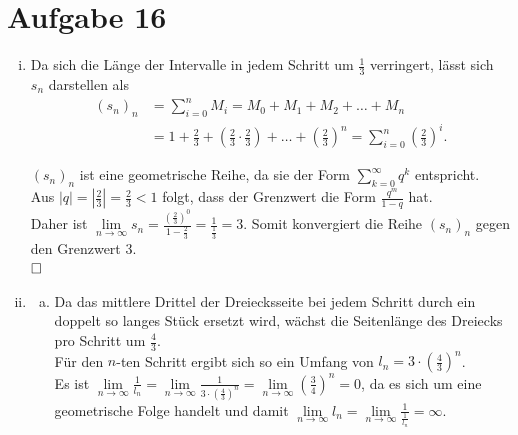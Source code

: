 \documentclass[12pt,a4paper]{article}
\newcommand{\qed}{\null\nobreak\hfill\square}
\begin{document}
\section*{Aufgabe 16}

\begin{enumerate}[(i)]
    \item Da sich die Länge der Intervalle in jedem Schritt um $\frac{1}{3}$ verringert, lässt sich $s_n$ darstellen als
    \begin{align*}
    (s_n)_n &= \sum\limits_{i=0}^n M_i = M_0 + M_1 + M_2 + \dots + M_n\\
    &= 1 + \frac{2}{3} + \left(\frac{2}{3} \cdot \frac{2}{3}\right) + \dots + \left(\frac{2}{3}\right)^n = \sum\limits_{i=0}^n \left(\frac{2}{3}\right)^i.
    \end{align*}

    $(s_n)_n$ ist eine geometrische Reihe, da sie der Form $\sum\limits_{k=0}^\infty q^k$ entspricht.\\
    Aus $|q| = \left|\frac{2}{3}\right| = \frac{2}{3} < 1$ folgt, dass der Grenzwert die Form $\frac{q^m}{1-q}$ hat.\\
    Daher ist $\lim\limits_{n \to \infty} s_n = \frac{\left(\frac{2}{3}\right)^0}{1 - \frac{2}{3}} = \frac{1}{\frac{1}{3}} = 3$.
    Somit konvergiert die Reihe $(s_n)_n$ gegen den Grenzwert 3.\\
    $\qed$

    \item \begin{enumerate}[(a)]
        \item Da das mittlere Drittel der Dreiecksseite bei jedem Schritt durch ein doppelt so langes Stück ersetzt wird, wächst die Seitenlänge des Dreiecks pro Schritt um $\frac{4}{3}$.\\
        Für den $n$-ten Schritt ergibt sich so ein Umfang von $l_n = 3 \cdot \left(\frac{4}{3}\right)^n$.\\
        Es ist $\lim\limits_{n \to \infty} \frac{1}{l_n} = \lim\limits_{n \to \infty} \frac{1}{3 \cdot \left(\frac{4}{3}\right)^n} = \lim\limits_{n \to \infty} \left(\frac{3}{4}\right)^n = 0$, da es sich um eine geometrische Folge handelt und damit $\lim\limits_{n \to \infty} l_n = \lim\limits_{n \to \infty} \frac{1}{\frac{1}{l_n}} = \infty$.


\end{enumerate}
\end{enumerate}
\end{document}
